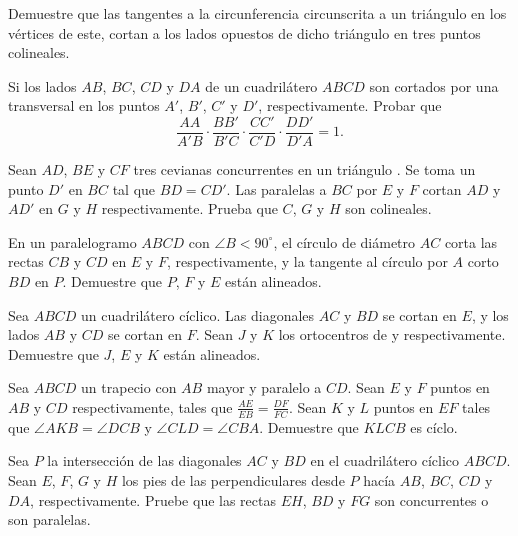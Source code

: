 \begin{section-problem}
    Demuestre que las tangentes a la circunferencia circunscrita a un triángulo en los vértices de este, cortan a los lados opuestos de dicho triángulo en tres puntos colineales.
\end{section-problem}

\begin{section-problem}
    Si los lados $AB$, $BC$, $CD$ y $DA$ de un cuadrilátero $ABCD$ son cortados por una transversal en los puntos $A'$, $B'$, $C'$ y $D'$, respectivamente.
    Probar que
    \[
        \dfrac{AA}{A'B} \cdot \dfrac{BB'}{B'C} \cdot \dfrac{CC'}{C'D} \cdot \dfrac{DD'}{D'A} = 1.
    \]
\end{section-problem}

\begin{section-problem}
    Sean $AD$, $BE$ y $CF$ tres cevianas concurrentes en un triángulo .
    Se toma un punto $D'$ en $BC$ tal que $BD = CD'$.
    Las paralelas a $BC$ por $E$ y $F$ cortan $AD$ y $AD'$ en $G$ y $H$ respectivamente.
    Prueba que $C$, $G$ y $H$ son colineales.
\end{section-problem}

\begin{section-problem}
    En un paralelogramo $ABCD$ con $\angle B < 90^\circ$, el círculo de diámetro $AC$ corta las rectas $CB$ y $CD$ en $E$ y $F$, respectivamente, y la tangente al círculo por $A$ corto $BD$ en $P$.
    Demuestre que $P$, $F$ y $E$ están alineados.
\end{section-problem}

\begin{section-problem}
    Sea $ABCD$ un cuadrilátero cíclico.
    Las diagonales $AC$ y $BD$ se cortan en $E$, y los lados $AB$ y $CD$ se cortan en $F$.
    Sean $J$ y $K$ los ortocentros de  y  respectivamente.
    Demuestre que $J$, $E$ y $K$ están alineados.
\end{section-problem}

\begin{section-problem}
    Sea $ABCD$ un trapecio con $AB$ mayor y paralelo a $CD$.
    Sean $E$ y $F$ puntos en $AB$ y $CD$ respectivamente, tales que $\frac{AE}{EB} = \frac{DF}{FC}$.
    Sean $K$ y $L$ puntos en $EF$ tales que $\angle AKB = \angle DCB$ y $\angle CLD = \angle CBA$.
    Demuestre que $KLCB$ es cíclo.
\end{section-problem}

\begin{section-problem}
    Sea $P$ la intersección de las diagonales $AC$ y $BD$ en el cuadrilátero cíclico $ABCD$.
    Sean $E$, $F$, $G$ y $H$ los pies de las perpendiculares desde $P$ hacía $AB$, $BC$, $CD$ y $DA$, respectivamente.
    Pruebe que las rectas $EH$, $BD$ y $FG$ son concurrentes o son paralelas.
\end{section-problem}
